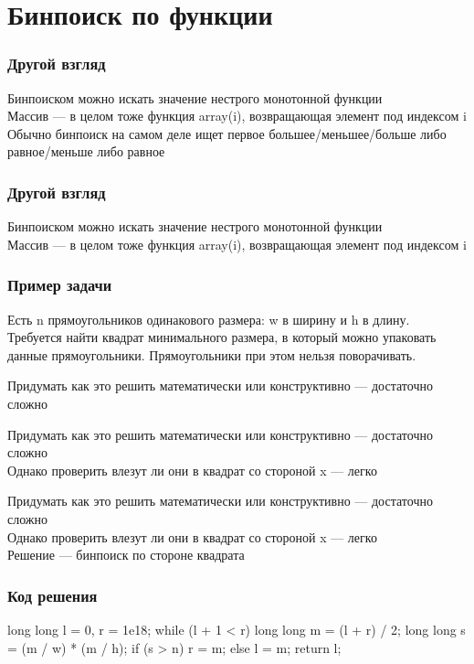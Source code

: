 \section{Бинпоиск по функции}

\begin{frame}
    \frametitle{Другой взгляд}
    Бинпоиском можно искать значение нестрого монотонной функции\\
    \small Массив --- в целом тоже функция array(i), возвращающая элемент под индексом i\\
    \small Обычно бинпоиск на самом деле ищет первое большее/меньшее/больше либо равное/меньше либо равное 
\end{frame}

\begin{frame}
    \frametitle{Другой взгляд}
    Бинпоиском можно искать значение нестрого монотонной функции\\
    \small Массив --- в целом тоже функция array(i), возвращающая элемент под индексом i 
\end{frame}

\begin{frame}
    \frametitle{Пример задачи}
    Есть n прямоугольников одинакового размера: w в ширину и h в длину. Требуется найти квадрат минимального размера, в который можно упаковать данные прямоугольники. Прямоугольники при этом нельзя поворачивать.
\end{frame}

\begin{frame}
    Придумать как это решить математически или конструктивно --- достаточно сложно\\
\end{frame}

\begin{frame}
    Придумать как это решить математически или конструктивно --- достаточно сложно\\
    Однако проверить влезут ли они в квадрат со стороной x --- легко
\end{frame}

\begin{frame}
    Придумать как это решить математически или конструктивно --- достаточно сложно\\
    Однако проверить влезут ли они в квадрат со стороной x --- легко\\
    Решение --- бинпоиск по стороне квадрата
\end{frame}

\begin{frame}[fragile]
    \frametitle{Код решения}
    \begin{cpp}
long long l = 0, r = 1e18;
while (l + 1 < r) {
    long long m = (l + r) / 2;
    long long s = (m / w) * (m / h);
	if (s > n) {
		r = m;
	} else l = m;
}
return l;
    \end{cpp}
\end{frame}
